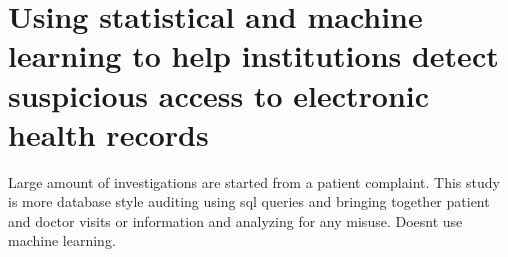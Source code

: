 \documentclass[12pt]{article}
\begin{document}
\section{Using statistical and machine learning to help institutions detect suspicious access to electronic health records}
Large amount of investigations are started from a patient complaint.  \cite{Fabbri:2011:EA:2047485.2047486} 
This study is more database style auditing using sql queries and bringing together patient and doctor visits or information and analyzing for any misuse. Doesnt use machine learning. 


\footnotesize

\end{document}
